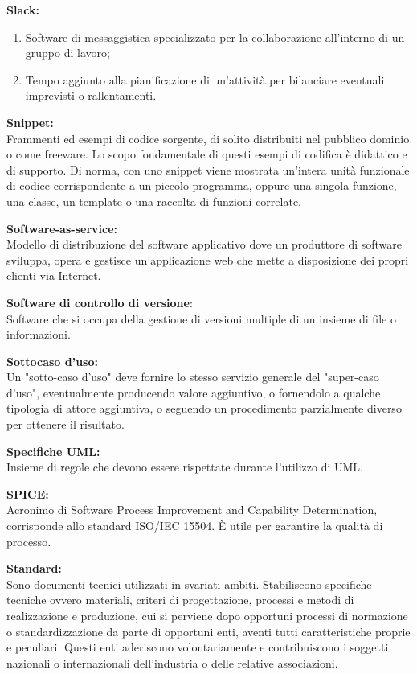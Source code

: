 \documentclass[a4paper, oneside, openany, dvipsnames, table]{article}
\begin{document}
\textbf{Slack:}
\begin{enumerate}
	\item Software di messaggistica specializzato per la collaborazione all'interno di un gruppo di lavoro;
	\item Tempo aggiunto alla pianificazione di un'attività per bilanciare eventuali imprevisti o rallentamenti.
\end{enumerate} 

\textbf{Snippet:}\\	Frammenti ed esempi di codice sorgente, di solito distribuiti nel 
pubblico dominio o come freeware. Lo scopo fondamentale di questi esempi di codifica è 
didattico e di supporto. Di norma, con uno snippet viene mostrata un'intera unità funzionale 
di codice corrispondente a un piccolo programma, oppure una singola funzione, una classe, 
un template o una raccolta di funzioni correlate.

\textbf{Software-as-service:}\\	Modello di distribuzione del software applicativo dove un produttore di software sviluppa, opera e gestisce un'applicazione web che mette a disposizione dei propri clienti via Internet.

\textbf{Software di controllo di versione}:\\ Software che si occupa della  gestione di versioni multiple di un insieme di file o informazioni.

\textbf{Sottocaso d'uso:}\\
Un "sotto-caso d'uso" deve fornire lo stesso servizio generale del "super-caso d'uso", eventualmente producendo valore aggiuntivo, o fornendolo a qualche tipologia di attore aggiuntiva, o seguendo un procedimento parzialmente diverso per ottenere il risultato.

\textbf{Specifiche UML:}\\	
Insieme di regole che devono essere rispettate durante l'utilizzo di UML.

\textbf{SPICE:}\\
Acronimo di Software Process Improvement and Capability Determination, corrisponde allo standard ISO/IEC 15504. \`E utile per garantire la qualità di processo.

\textbf{Standard:}\\	Sono documenti tecnici utilizzati in svariati ambiti. Stabiliscono specifiche tecniche ovvero materiali, criteri di progettazione, processi e metodi di realizzazione e produzione, cui si perviene dopo opportuni processi di normazione o standardizzazione da parte di opportuni enti, aventi tutti caratteristiche proprie e peculiari. Questi enti aderiscono volontariamente e contribuiscono i soggetti nazionali o internazionali dell'industria o delle relative associazioni.
\end{document}
